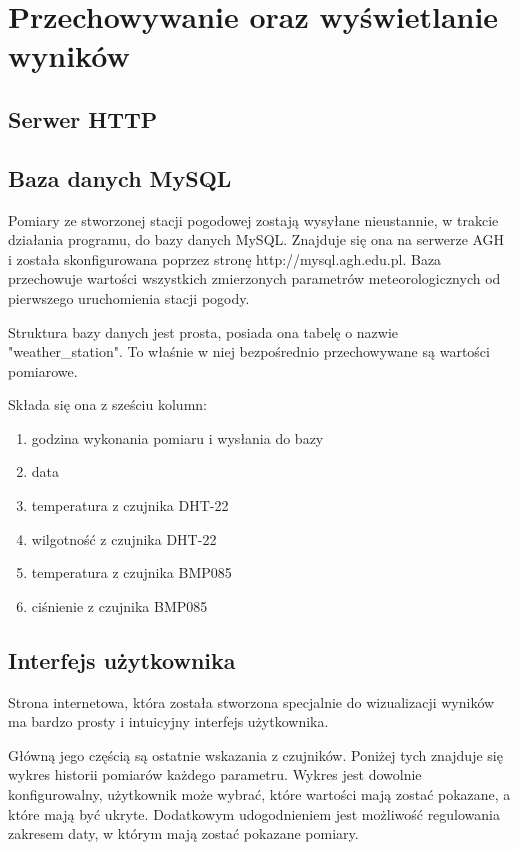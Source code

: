 \chapter{Przechowywanie oraz wyświetlanie wyników}

\section{Serwer HTTP}

\section{Baza danych MySQL}
Pomiary ze stworzonej stacji pogodowej zostają wysyłane nieustannie, w trakcie działania programu, do bazy danych MySQL. Znajduje się ona na serwerze AGH i została skonfigurowana poprzez stronę http://mysql.agh.edu.pl. Baza przechowuje wartości wszystkich zmierzonych parametrów meteorologicznych od pierwszego uruchomienia stacji pogody.

Struktura bazy danych jest prosta, posiada ona tabelę o nazwie "weather\_station". To właśnie w niej bezpośrednio przechowywane są wartości pomiarowe.

Składa się ona z sześciu kolumn:
\begin{enumerate}
\item godzina wykonania pomiaru i wysłania do bazy
\item data
\item temperatura z czujnika DHT-22
\item wilgotność z czujnika DHT-22
\item temperatura z czujnika BMP085
\item ciśnienie z czujnika BMP085
\end{enumerate}

\section{Interfejs użytkownika}
Strona internetowa, która została stworzona specjalnie do wizualizacji wyników ma bardzo prosty i intuicyjny interfejs użytkownika.

Główną jego częścią są ostatnie wskazania z czujników. Poniżej tych znajduje się wykres historii pomiarów każdego parametru. Wykres jest dowolnie konfigurowalny, użytkownik może wybrać, które wartości mają zostać pokazane, a które mają być ukryte. Dodatkowym udogodnieniem jest możliwość regulowania zakresem daty, w którym mają zostać pokazane pomiary.